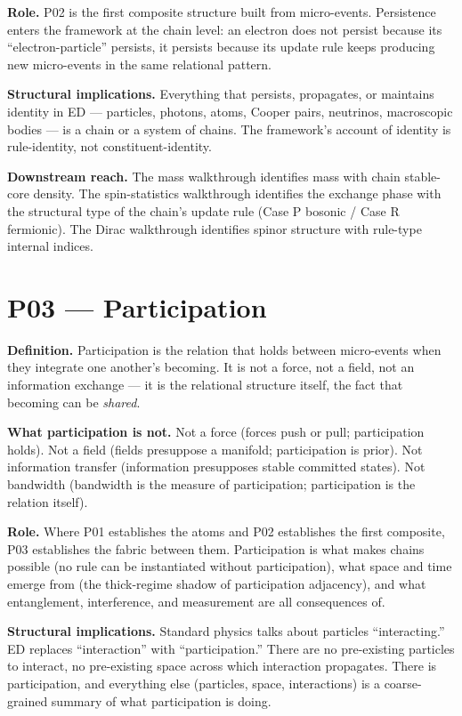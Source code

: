 \documentclass[11pt,a4paper]{article}
\begin{document}
\textbf{Role.} P02 is the first composite structure built from micro-events. Persistence enters the framework at the chain level: an electron does not persist because its ``electron-particle'' persists, it persists because its update rule keeps producing new micro-events in the same relational pattern.

\textbf{Structural implications.} Everything that persists, propagates, or maintains identity in ED --- particles, photons, atoms, Cooper pairs, neutrinos, macroscopic bodies --- is a chain or a system of chains. The framework's account of identity is rule-identity, not constituent-identity.

\textbf{Downstream reach.} The mass walkthrough identifies mass with chain stable-core density. The spin-statistics walkthrough identifies the exchange phase with the structural type of the chain's update rule (Case P bosonic / Case R fermionic). The Dirac walkthrough identifies spinor structure with rule-type internal indices.

\section{P03 --- Participation}

\textbf{Definition.} Participation is the relation that holds between micro-events when they integrate one another's becoming. It is not a force, not a field, not an information exchange --- it is the relational structure itself, the fact that becoming can be \emph{shared}.

\textbf{What participation is not.} Not a force (forces push or pull; participation holds). Not a field (fields presuppose a manifold; participation is prior). Not information transfer (information presupposes stable committed states). Not bandwidth (bandwidth is the measure of participation; participation is the relation itself).

\textbf{Role.} Where P01 establishes the atoms and P02 establishes the first composite, P03 establishes the fabric between them. Participation is what makes chains possible (no rule can be instantiated without participation), what space and time emerge from (the thick-regime shadow of participation adjacency), and what entanglement, interference, and measurement are all consequences of.

\textbf{Structural implications.} Standard physics talks about particles ``interacting.'' ED replaces ``interaction'' with ``participation.'' There are no pre-existing particles to interact, no pre-existing space across which interaction propagates. There is participation, and everything else (particles, space, interactions) is a coarse-grained summary of what participation is doing.
\end{document}

